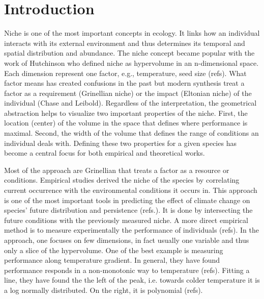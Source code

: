 \section*{Introduction}
Niche is one of the most important concepts in ecology.
It links how an individual interacts with its external environment and thus determines its temporal and spatial distribution and abundance.
The niche concept became popular with the work of Hutchinson who defined niche as hypervolume in an n-dimensional space.
Each dimension represent one factor, e.g., temperature, seed size (refs).
What factor means has created confusions in the past but modern synthesis treat a factor as a requirement (Grinellian niche) or the impact (Eltonian niche) of the individual (Chase and Leibold).
Regardless of the interpretation, the geometrical abstraction helps to visualize two important properties of the niche.
First, the location (center) of the volume in the space that defines where performance is maximal.
Second, the width of the volume that defines the range of conditions an individual deals with. 
Defining these two properties for a given species has become a central focus for both empirical and theoretical works.
%

Most of the approach are Grinellian that treats a factor as a resource or conditions.
Empirical studies derived the niche of the species by correlating current occurrence with the environmental conditions it occurs in. 
This approach  is one of the most important tools in predicting the effect of climate change on species' future distribution and persistence (refs.).
It is done by intersecting the future conditions with the previously measured niche.
A more direct empirical method is to measure experimentally the performance of individuals (refs).
In the approach, one focuses on few dimensions, in fact usually one variable and thus only a slice of the hypervolume.
One of the best example is measuring performance along temperature gradient. 
In general, they have found performance responds in a non-monotonic way to temperature (refs).
Fitting a line, they have found the the left of the peak, i.e. towards colder temperature it is a log normally distributed.
On the right, it is polynomial (refs).


